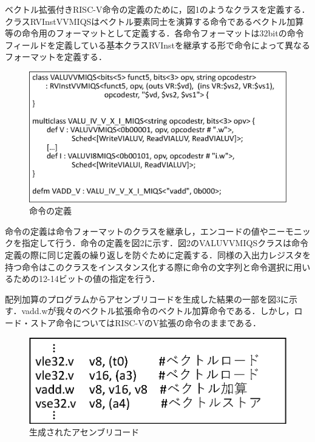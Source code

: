 ﻿\documentclass[a4j]{jarticle}
\begin{document}
ベクトル拡張付きRISC-V命令の定義のために，図1のようなクラスを定義する．クラスRVInstVVMIQSはベクトル要素同士を演算する命令であるベクトル加算等の命令用のフォーマットとして定義する．各命令フォーマットは32bitの命令フィールドを定義している基本クラスRVInstを継承する形で命令によって異なるフォーマットを定義する．

\begin{figure}[t]
    \centering
    \includegraphics[scale=0.35]{Instruction.eps}
    \caption{命令の定義}
    \label{fig:Instruciton}
\end{figure}

命令の定義は命令フォーマットのクラスを継承し，エンコードの値やニーモニックを指定して行う．命令の定義を図2に示す．図2のVALUVVMIQSクラスは命令定義の際に同じ定義の繰り返しを防ぐために定義する．同様の入出力レジスタを持つ命令はこのクラスをインスタンス化する際に命令の文字列と命令選択に用いるための12-14ビットの値の指定を行う．

配列加算のプログラムからアセンブリコードを生成した結果の一部を図3に示す．vadd.wが我々のベクトル拡張命令のベクトル加算命令である．しかし，ロード・ストア命令についてはRISC-VのV拡張の命令のままである．

\begin{figure}[tb]
    \centering
    \includegraphics[scale=0.4]{miqs_assembly.eps}
    \caption{生成されたアセンブリコード}
    \label{fig:assembly}
\end{figure}
\end{document}
